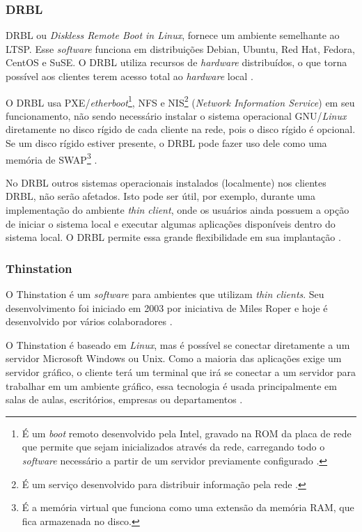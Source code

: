 \documentclass[
	12pt,				%
	openright,			%
	twoside,			%
	a4paper,			%
	chapter=TITLE,		%
	english,			%
	brazil				%
	]{abntex2}
\begin{document}
\subsubsection{DRBL}

DRBL ou \textit{Diskless Remote Boot in Linux}, fornece um ambiente semelhante ao LTSP. Esse \textit{software} funciona em distribuições Debian, Ubuntu, Red Hat, Fedora, CentOS e SuSE. O DRBL utiliza recursos de \textit{hardware} distribuídos, o que torna possível aos clientes terem acesso total ao \textit{hardware} local \cite{drbl}.

O DRBL usa PXE/\textit{etherboot}\footnote{É um \textit{boot} remoto desenvolvido pela Intel, gravado na ROM da placa de rede que permite que sejam inicializados através da rede, carregando todo o \textit{software} necessário a partir de um servidor previamente configurado \cite{pxe}.}, NFS e NIS\footnote{É um serviço desenvolvido para distribuir informação pela rede \cite{nis}.} (\textit{Network Information Service}) em seu funcionamento, não sendo necessário instalar o sistema operacional GNU/\textit{Linux} diretamente no disco rígido de cada cliente na rede, pois o disco rígido é opcional. Se um disco rígido estiver presente, o DRBL pode fazer uso dele como uma memória de SWAP\footnote{É a memória virtual que funciona como uma extensão da memória RAM, que fica armazenada no disco.} \cite{drbl,piaui,Frank.drbl}.

No DRBL outros sistemas operacionais instalados (localmente) nos clientes DRBL, não serão afetados. Isto pode ser útil, por exemplo, durante uma implementação do ambiente \textit{thin client}, onde os usuários ainda possuem a opção de iniciar o sistema local e executar algumas aplicações disponíveis dentro do sistema local. O DRBL permite essa grande flexibilidade em sua implantação \cite{drbl}.

\subsubsection{Thinstation}

O Thinstation é um \textit{software} para ambientes que utilizam \textit{thin clients}. Seu desenvolvimento foi iniciado em 2003 por iniciativa de Miles Roper e hoje é desenvolvido por vários colaboradores \cite{Thinstationl,piaui}.

O Thinstation é baseado em \textit{Linux}, mas é possível se conectar diretamente a um servidor Microsoft Windows ou Unix. Como a maioria das aplicações exige um servidor gráfico, o cliente terá um terminal que irá se conectar a um servidor para trabalhar em um ambiente gráfico, essa tecnologia é usada principalmente em salas de aulas, escritórios, empresas ou departamentos \cite{Thinstationl}.
\end{document}
